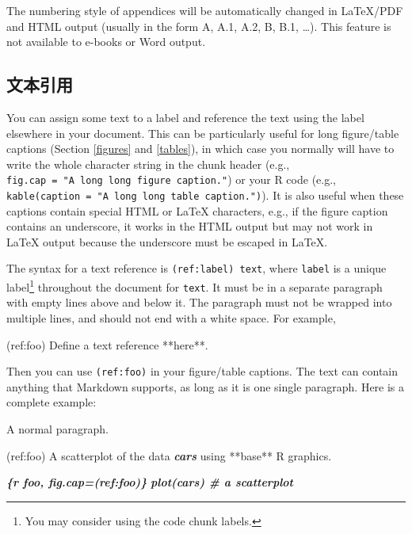 \documentclass[
  12pt,
]{krantz}
\newenvironment{Shaded}{\begin{snugshade}}{\end{snugshade}}
\newcommand{\InformationTok}[1]{\textcolor[rgb]{0.56,0.35,0.01}{\textbf{\textit{#1}}}}
\newcommand{\NormalTok}[1]{#1}
\theoremstyle{definition}
\theoremstyle{definition}
\theoremstyle{definition}
\theoremstyle{definition}
\theoremstyle{remark}
\begin{document}
The numbering style of appendices will be automatically changed in LaTeX/PDF and HTML output (usually in the form A, A.1, A.2, B, B.1, \ldots). This feature is not available to e-books or Word output.

\hypertarget{ux6587ux672cux5f15ux7528}{%
\subsection{文本引用}\label{ux6587ux672cux5f15ux7528}}

You can assign some text to a label and reference the text using the label elsewhere in your document. This can be particularly useful for long figure/table captions (Section \ref{figures} and \ref{tables}), in which case you normally will have to write the whole character string in the chunk header (e.g., \texttt{fig.cap\ =\ "A\ long\ long\ figure\ caption."}) or your R code (e.g., \texttt{kable(caption\ =\ "A\ long\ long\ table\ caption.")}). It is also useful when these captions contain special HTML or LaTeX characters, e.g., if the figure caption contains an underscore, it works in the HTML output but may not work in LaTeX output because the underscore must be escaped in LaTeX.

The syntax for a text reference is \texttt{(ref:label)\ text}, where \texttt{label} is a unique label\footnote{You may consider using the code chunk labels.} throughout the document for \texttt{text}. It must be in a separate paragraph with empty lines above and below it. The paragraph must not be wrapped into multiple lines, and should not end with a white space. For example,

\begin{Shaded}
\begin{Highlighting}[]
\NormalTok{(ref:foo) Define a text reference **here**. }
\end{Highlighting}
\end{Shaded}

Then you can use \texttt{(ref:foo)} in your figure/table captions. The text can contain anything that Markdown supports, as long as it is one single paragraph. Here is a complete example:

\begin{Shaded}
\begin{Highlighting}[]
\NormalTok{A normal paragraph.}

\NormalTok{(ref:foo) A scatterplot of the data }\InformationTok{\textasciigrave{}cars\textasciigrave{}}\NormalTok{ using **base** R graphics. }

\InformationTok{\textasciigrave{}\textasciigrave{}\textasciigrave{}\{r foo, fig.cap=\textquotesingle{}(ref:foo)\textquotesingle{}\}}
\InformationTok{plot(cars)  \# a scatterplot}
\InformationTok{\textasciigrave{}\textasciigrave{}\textasciigrave{}}
\end{Highlighting}
\end{Shaded}
\end{document}
